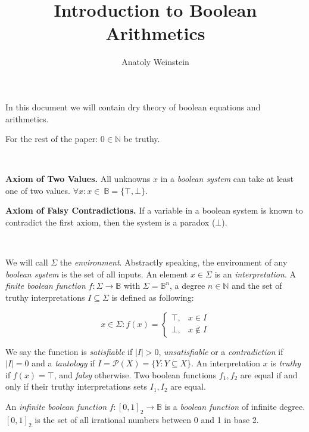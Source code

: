 \documentclass[12pt, letterpaper]{article}
\title{Introduction to Boolean Arithmetics}
\author{Anatoly Weinstein}
\begin{document}
    \maketitle

    In this document we will contain dry theory of boolean equations
    and arithmetics.

    For the rest of the paper: $0 \in \mathbb{N}$ be truthy.

    {\ }

    \textbf{Axiom of Two Values.} All unknowns $x$ in a \emph{boolean
    system} can take at least one of two values. $\forall x: x \in\
    \mathbb{B} =\{\top,\bot\}$.

    \textbf{Axiom of Falsy Contradictions.} If a variable in a boolean
    system is known to contradict the first axiom, then the system is a
    paradox ($\bot$).

    {\ }

    We will call $\Sigma$ the \emph{environment}. Abstractly speaking, the 
    environment of any \emph{boolean system} is the set of all inputs.
    An element $x\in\Sigma$ is an \emph{interpretation}. A
    \emph{finite boolean function} $f:\Sigma\to\mathbb{B}$ with $\Sigma =
    \mathbb{B}^n$, a degree $n\in \mathbb{N}$ and the set of truthy
    interpretations $I \subseteq \Sigma$ is defined as following:

    \begin{equation}
        \nonumber
        x \in \Sigma: f(x) =
        \begin{cases}
            \top, & x \in I \\
            \bot, & x \not\in I
        \end{cases}
    \end{equation}

    We say the function is \emph{satisfiable} if $|I| > 0$, 
    \emph{unsatisfiable} or a \emph{contradiction} if $|I| = 0$
    and a \emph{tautology} if $I=\mathcal{P}(X) = \{Y:Y\subseteq X\}$.
    An interpretation $x$ is \emph{truthy} if $f(x) = \top$, and
    \emph{falsy} otherwise. Two boolean functions $f_1, f_2$ are equal
    if and only if their truthy interpretations sets $I_1, I_2$ are equal.

    An \emph{infinite boolean function} $f:{[0,1]}_2\rightarrow\mathbb{B}$
    is a \emph{boolean function} of infinite degree. ${[0,1]}_2$ is the 
    set of all irrational numbers between 0 and 1 in base 2. 

    {\ } %
\end{document}
